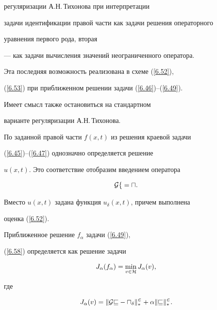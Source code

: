 регуляризации А.Н.\,Тихонова при интерпретации 


задачи идентификации правой части как задачи решения операторного


уравнения первого рода, вторая


--- как задачи вычисления значений неограниченного оператора.


Эта последняя возможность реализована в схеме (\ref{6.52}),


(\ref{6.53}) при приближенном решении задачи (\ref{6.46})--(\ref{6.49}).


Имеет смысл также остановиться на стандартном


варианте регуляризации А.Н.\,Тихонова.





По заданной правой части $f(x,t)$ из решения краевой задачи


(\ref{6.45})--(\ref{6.47}) однозначно определяется решение


$u(x,t)$. Это соответствие отобразим введением оператора


\begin{equation}\label{6.58}


\cal{G} f = u.


\end{equation}


Вместо $u(x,t)$ задана функция $u_{\delta}(x,t)$, причем выполнена


оценка (\ref{6.52}).





Приближенное решение $f_{\alpha}$ задачи (\ref{6.49}),


(\ref{6.58}) определяется как решение задачи


\begin{equation}\label{6.59}


J_{\alpha}(f_{\alpha}) = \min_{v \in \cal{H}} J_{\alpha} (v),


\end{equation}


где


\begin{equation}\label{6.60}


J_{\alpha} (v) = \|\cal{G} v - u_{\delta} \|_*^2 + \alpha


\|v\|_*^2 .


\end{equation}





